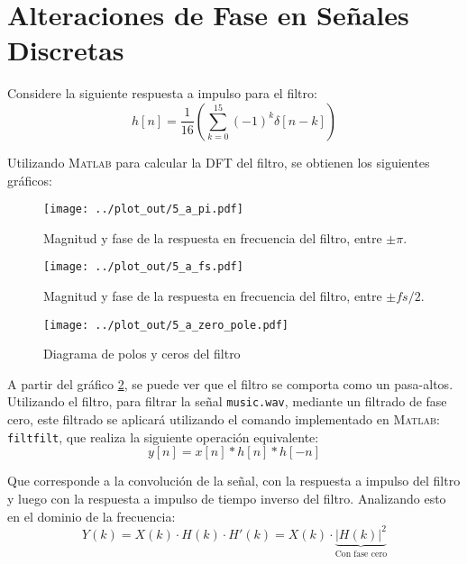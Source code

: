 \section{Alteraciones de Fase en Señales Discretas}
		Considere la siguiente respuesta a impulso para el filtro:
		\begin{equation}
			h[n] = \frac{1}{16} \left( \sum_{k=0}^{15}(-1)^{k} \delta[n-k] \right)
			\label{eq:5_phase}
		\end{equation}
		
		Utilizando \textsc{Matlab} para calcular la \textsc{DFT} del filtro, se obtienen los siguientes gráficos:
		\begin{figure}[H]
			\center
			\texttt{[image: ../plot\_out/5\_a\_pi.pdf]}
			\caption{Magnitud y fase de la respuesta en frecuencia del filtro, entre $ \pm \pi$.}
			\label{fig:5_a_pi}
		\end{figure}	
		
		\begin{figure}[H]
			\center
			\texttt{[image: ../plot\_out/5\_a\_fs.pdf]}
			\caption{Magnitud y fase de la respuesta en frecuencia del filtro, entre $ \pm fs/2$.}
			\label{fig:5_a_fs}
		\end{figure}	
		
		\begin{figure}[H]
			\center
			\texttt{[image: ../plot\_out/5\_a\_zero\_pole.pdf]}
			\caption{Diagrama de polos y ceros del filtro}
			\label{fig:5_a_pole_diagram}
		\end{figure}	
		
		A partir del gráfico \ref{fig:5_a_fs}, se puede ver que el filtro se comporta como un pasa-altos. Utilizando el filtro, para filtrar la señal \texttt{music.wav}, mediante un filtrado de fase cero, este filtrado se aplicará utilizando el comando implementado en \textsc{Matlab}: \texttt{filtfilt}, que realiza la siguiente operación equivalente:
		\begin{equation}
			y[n] = x[n] * h[n] * h[-n]
		\end{equation}		 
		
		Que corresponde a la convolución de la señal, con la respuesta a impulso del filtro y luego con la respuesta a impulso de tiempo inverso del filtro. Analizando esto en el dominio de la frecuencia:
		\begin{equation}
		Y(k) = X(k) \cdot H(k) \cdot H'(k) = X(k) \cdot \underbrace{|H(k)|^{2}}_\text{Con fase cero}
		\end{equation}
		
